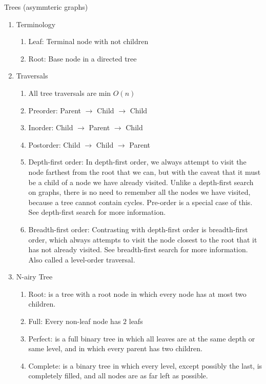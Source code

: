 \documentclass[12pt]{article}
\renewcommand{\=}[1]{\stackrel{#1}{=}} %
\theoremstyle{definition}
\theoremstyle{remark}
\begin{document}
\begin{enumerate}
\begin{enumerate}
    \end{enumerate}
    Trees (asymmteric graphs)
    \begin{enumerate}
    \item Terminology
      \begin{enumerate}
      \item Leaf: Terminal node with not children
      \item Root: Base node in a directed tree
      \end{enumerate}
    \item Traversals
      \begin{enumerate}
      \item All tree traversals are min $O(n)$
      \item Preorder: Parent $\rightarrow$ Child $\rightarrow$ Child
      \item Inorder: Child $\rightarrow$ Parent $\rightarrow$ Child
      \item Postorder: Child $\rightarrow$ Child $\rightarrow$ Parent
      \item Depth-first order:
        In depth-first order, we always attempt to visit the node farthest from the root that we can, but with the caveat that it must be a child of a node we have already visited. Unlike a depth-first search on graphs, there is no need to remember all the nodes we have visited, because a tree cannot contain cycles. Pre-order is a special case of this. See depth-first search for more information.
      \item Breadth-first order:
Contrasting with depth-first order is breadth-first order, which always attempts to visit the node closest to the root that it has not already visited. See breadth-first search for more information. Also called a level-order traversal.
      \end{enumerate}
    \item N-airy Tree
      \begin{enumerate}
      \item Root: is a tree with a root node in which every node has at most two children.
      \item Full: Every non-leaf node has $2$ leafs 
      \item Perfect: is a full binary tree in which all leaves are at the same depth or same level, and in which every parent has two children.
      \item Complete: is a binary tree in which every level, except possibly the last, is completely filled, and all nodes are as far left as possible.

\end{enumerate}
\end{enumerate}
\end{enumerate}
\end{document}
